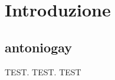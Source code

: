 \chapter{Introduzione}
\label{chap:introduction}
\section{antoniogay}
\label{sect:gay}
TEST.
TEST.
TEST
